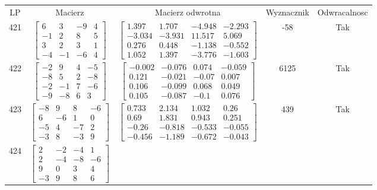 \documentclass[a4paper,12pt]{article}
\begin{document}
\bgroup {} \vspace{0.2in} \begin{tabular}{c c c c c}
LP & Macierz & Macierz odwrotna & Wyznacznik & Odwracalnosc\\
421
&
$\begin{bmatrix} 6 & 3 & -9 & 4 \\ -1 & 2 & 8 & 5 \\ 3 & 2 & 3 & 1 \\ -4 & -1 & -6 & 4 \end{bmatrix}$
&
$\begin{bmatrix} 1.397 & 1.707 & -4.948 & -2.293 \\ -3.034 & -3.931 & 11.517 & 5.069 \\ 0.276 & 0.448 & -1.138 & -0.552 \\ 1.052 & 1.397 & -3.776 & -1.603 \end{bmatrix}$
&
-58
&
Tak
\\
422
&
$\begin{bmatrix} -2 & 9 & 4 & -5 \\ -8 & 5 & 2 & -8 \\ -2 & -1 & 7 & -6 \\ -9 & -8 & 6 & 3 \end{bmatrix}$
&
$\begin{bmatrix} -0.002 & -0.076 & 0.074 & -0.059 \\ 0.121 & -0.021 & -0.07 & 0.007 \\ 0.106 & -0.099 & 0.068 & 0.049 \\ 0.105 & -0.087 & -0.1 & 0.076 \end{bmatrix}$
&
6125
&
Tak
\\
423
&
$\begin{bmatrix} -8 & 9 & 8 & -6 \\ 6 & -6 & 1 & 0 \\ -5 & 4 & -7 & 2 \\ -3 & 8 & -3 & 9 \end{bmatrix}$
&
$\begin{bmatrix} 0.733 & 2.134 & 1.032 & 0.26 \\ 0.69 & 1.831 & 0.943 & 0.251 \\ -0.26 & -0.818 & -0.533 & -0.055 \\ -0.456 & -1.189 & -0.672 & -0.043 \end{bmatrix}$
&
439
&
Tak
\\
424
&
$\begin{bmatrix} 2 & -2 & -4 & 1 \\ 2 & -4 & -8 & -6 \\ 9 & 0 & 3 & 4 \\ -3 & 9 & 8 & 6 \end{bmatrix}$

\end{tabular}
\end{document}
